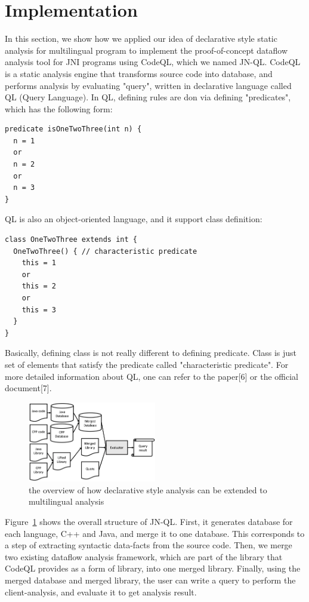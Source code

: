 \section{Implementation}
In this section, we show how we applied our idea of declarative style static
analysis for multilingual program to implement the proof-of-concept dataflow
analysis tool for JNI programs using CodeQL, which we named JN-QL. CodeQL is a
static analysis engine that transforms source code into database, and performs
analysis by evaluating "query", written in declarative language called QL
(Query Language). In QL, defining rules are don via defining "predicates",
which has the following form:
\begin{lstlisting}[style=codeql,xleftmargin=2.5em]
predicate isOneTwoThree(int n) {
  n = 1
  or
  n = 2
  or
  n = 3
}
\end{lstlisting}

QL is also an object-oriented language, and it support class definition:
\begin{lstlisting}[style=codeql,xleftmargin=2.5em]
class OneTwoThree extends int {
  OneTwoThree() { // characteristic predicate
    this = 1
    or
    this = 2
    or
    this = 3
  }
}
\end{lstlisting}

Basically, defining class is not really different to defining predicate.  Class
is just set of elements that satisfy the predicate called "characteristic
predicate". For more detailed information about QL, one can refer to the
paper[6] or the official document[7].

\begin{figure}[t]
  \centering
  \vspace{2mm}
  \includegraphics[width=0.5\textwidth]{img/Fig1}
  \vspace*{-1.5em}
  \caption{the overview of how declarative style analysis can be
  extended to multilingual analysis}
  \label{fig:Fig1}
\vspace*{-.5em}
\end{figure}

Figure~\ref{fig:Fig1} shows the overall structure of JN-QL. First, it generates database
for each language, C++ and Java, and merge it to one database. This corresponds
to a step of extracting syntactic data-facts from the source code. Then, we
merge two existing dataflow analysis framework, which are part of the library
that CodeQL provides as a form of library, into one merged library. Finally,
using the merged database and merged library, the user can write a query to
perform the client-analysis, and evaluate it to get analysis result.

